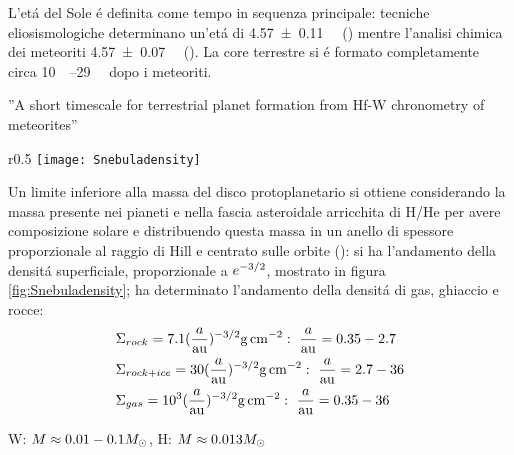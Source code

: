 L'et\'a del Sole \'e definita come tempo in sequenza principale: tecniche eliosismologiche determinano un'et\'a di \SI{4.57+-0.11}{\giga\year} (\cite{bonanno2002age}) mentre l'analisi chimica dei meteoriti \SI{4.57+-0.07}{\giga\year} (\cite{bahcall1995solar}).
La core terrestre si \'e formato completamente circa \SIrange{10}{29}{\mega\year} dopo i meteoriti.

\begin{workout}
''A short timescale for terrestrial planet formation from Hf-W chronometry of meteorites''
\end{workout}

\begin{wrapfigure}[6]{r}{0.5\textwidth}
\texttt{[image: Snebuladensity]}\caption{Andamento minimum mass solar nebula (MMSN). Da \cite{weidenschilling1977distribution}.}\label{fig:Snebuladensity}
\end{wrapfigure}

Un limite inferiore alla massa del disco protoplanetario si ottiene  considerando la massa presente nei pianeti e nella fascia asteroidale arricchita di H/He per avere composizione solare e distribuendo questa massa in un anello di spessore proporzionale al raggio di Hill e centrato sulle orbite (\cite{weidenschilling1977distribution}): si ha l'andamento della densit\'a superficiale, proporzionale a $e^{-3/2}$, mostrato in figura \ref{fig:Snebuladensity}; \cite{hayashi1981structure} ha determinato l'andamento della densit\'a di gas, ghiaccio e rocce:
\begin{align}
&\Sigma_{rock}=7.1(\frac{a}{\si{\astronomicalunit}})\expy{-3/2}\si{\gram\per\square\cm}:\ \frac{a}{\si{\astronomicalunit}}=0.35-2.7\\
&\Sigma_{rock+ice}=30(\frac{a}{\si{\astronomicalunit}})\expy{-3/2}\si{\gram\per\square\cm}:\ \frac{a}{\si{\astronomicalunit}}=2.7-36\\
&\Sigma_{gas}=\num{e3}(\frac{a}{\si{\astronomicalunit}})\expy{-3/2}\si{\gram\per\square\cm}:\ \frac{a}{\si{\astronomicalunit}}=0.35-36
\end{align}

\begin{workout}
W: $M\approx0.01-0.1M_{\odot}$, H: $M\approx0.013M_{\odot}$
\end{workout}

\begin{workout}

\end{workout}


